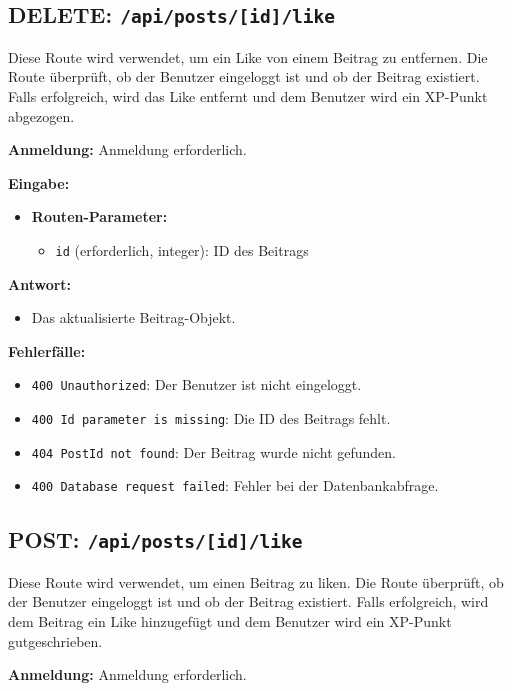 \documentclass[a4paper,12pt]{article}
\begin{document}
\newpage
\subsection{DELETE: \texttt{/api/posts/[id]/like}}

Diese Route wird verwendet, um ein Like von einem Beitrag zu entfernen. Die Route überprüft, ob der Benutzer eingeloggt ist und ob der Beitrag existiert. Falls erfolgreich, wird das Like entfernt und dem Benutzer wird ein XP-Punkt abgezogen.

\textbf{Anmeldung:} Anmeldung erforderlich.

\textbf{Eingabe:}
\begin{itemize}
    \item \textbf{Routen-Parameter:}
    \begin{itemize}
        \item \texttt{id} (erforderlich, integer): ID des Beitrags
    \end{itemize}
\end{itemize}

\textbf{Antwort:}
\begin{itemize}
    \item Das aktualisierte Beitrag-Objekt.
\end{itemize}

\textbf{Fehlerfälle:}
\begin{itemize}
    \item \texttt{400 Unauthorized}: Der Benutzer ist nicht eingeloggt.
    \item \texttt{400 Id parameter is missing}: Die ID des Beitrags fehlt.
    \item \texttt{404 PostId not found}: Der Beitrag wurde nicht gefunden.
    \item \texttt{400 Database request failed}: Fehler bei der Datenbankabfrage.
\end{itemize}

\newpage
\subsection{POST: \texttt{/api/posts/[id]/like}}

Diese Route wird verwendet, um einen Beitrag zu liken. Die Route überprüft, ob der Benutzer eingeloggt ist und ob der Beitrag existiert. Falls erfolgreich, wird dem Beitrag ein Like hinzugefügt und dem Benutzer wird ein XP-Punkt gutgeschrieben.

\textbf{Anmeldung:} Anmeldung erforderlich.
\end{document}
